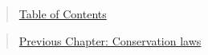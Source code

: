 
\begin{quote}
\href{https://www.authorea.com/users/24891/articles/131414/_show_article}{Table of Contents}
\end{quote}

\begin{quote}
\href{https://www.authorea.com/users/24891/articles/131413/_show_article}{Previous Chapter: Conservation laws}
\end{quote}



